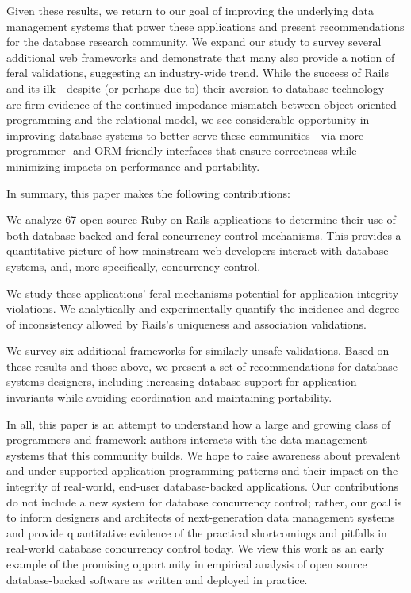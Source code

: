 Given these results, we return to our goal of improving the underlying
data management systems that power these applications and present
recommendations for the database research community. We expand our
study to survey several additional web frameworks and demonstrate that
many also provide a notion of feral validations, suggesting an
industry-wide trend. While the success of Rails and its ilk---despite
(or perhaps due to) their aversion to database technology---are firm
evidence of the continued impedance mismatch between object-oriented
programming and the relational model, we see considerable opportunity
in improving database systems to better serve these communities---via
more programmer- and ORM-friendly interfaces that ensure correctness
while minimizing impacts on performance and portability.

In summary, this paper makes the following contributions:
\begin{myitemize}
\item We analyze 67 open source Ruby on Rails applications to
  determine their use of both database-backed and feral concurrency
  control mechanisms. This provides a quantitative picture of how
  mainstream web developers interact with database systems, and, more
  specifically, concurrency control.

\item We study these applications' feral mechanisms potential for
  application integrity violations. We analytically and experimentally
  quantify the incidence and degree of inconsistency allowed by
  Rails's uniqueness and association validations.

\item We survey six additional frameworks for similarly unsafe
  validations. Based on these results and those above, we present a
  set of recommendations for database systems designers, including
  increasing database support for application invariants while avoiding
  coordination and maintaining portability.
\end{myitemize}

In all, this paper is an attempt to understand how a large and growing
class of programmers and framework authors interacts with the data
management systems that this community builds. We hope to raise
awareness about prevalent and under-supported application programming
patterns and their impact on the integrity of real-world, end-user
database-backed applications. Our contributions do not include a new
system for database concurrency control; rather, our goal is to inform
designers and architects of next-generation data management systems
and provide quantitative evidence of the practical shortcomings and
pitfalls in real-world database concurrency control today. We view
this work as an early example of the promising opportunity in
empirical analysis of open source database-backed software as written and deployed in practice.

